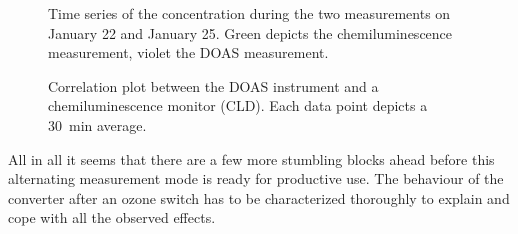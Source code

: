 \begin{figure}[htbp]
  \centering
  
  \hfill
  
  \caption{Time series of the  concentration during the two
    measurements on January 22 and January 25. Green depicts the
    chemiluminescence measurement, violet the DOAS measurement.}
  \label{fig:corr-ts}
\end{figure}
\begin{figure}[htbp]
  \centering
  
  \caption{Correlation plot between the DOAS instrument and a
    chemiluminescence monitor (CLD). Each data point depicts a
    \SI{30}{\minute} average.}
  \label{fig:cld-corr}
\end{figure}

All in all it seems that there are a few more stumbling blocks ahead
before this alternating measurement mode is ready for productive
use. The behaviour of the converter after an ozone switch has to be
characterized thoroughly to explain and cope with all the observed
effects.

